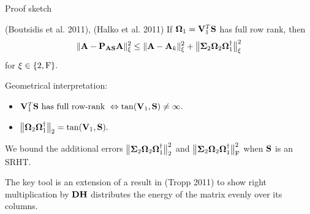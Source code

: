 \documentclass[xcolor=x11names,compress,ignorenonframetext]{beamer}
\renewcommand{\(}{\begin{columns}}
\renewcommand{\)}{\end{columns}}
\newcommand{\<}[1]{\begin{column}{#1}}
\renewcommand{\>}{\end{column}}
\def\refcolor{DodgerBlue4}
\newcommand{\refer}[1]{({\color{\refcolor}#1})}
\begin{document}
\begin{frame}{Proof sketch}

  \begin{block}{\refer{Boutsidis et al. 2011}, \refer{Halko et al. 2011} }
  If $\boldsymbol{\Omega}_1 = \mathbf{V}_1^T \mathbf{S}$ has full row rank, then
  \[
   \|\mathbf{A} - \mathbf{P}_{\mathbf{A}\mathbf{S}} \mathbf{A}\|_\xi^2 \leq \|\mathbf{A} - \mathbf{A}_k\|_\xi^2 + \big\| \boldsymbol{\Sigma}_2 \boldsymbol{\Omega}_2 \boldsymbol{\Omega}_1^\dagger\big\|_\xi^2
  \]
  for $\xi \in \{2, \mathrm{F}\}.$
 \end{block}

 Geometrical interpretation:
 \begin{itemize}
  \item $\mathbf{V}_1^T \mathbf{S} \text{ has full row-rank } \Leftrightarrow \tan(\mathbf{V}_1, \mathbf{S}) \neq \infty.$ 
  \item $\big\|\boldsymbol{\Omega}_2 \boldsymbol{\Omega}_1^\dagger\big\|_2 = \tan(\mathbf{V}_1, \mathbf{S}).$
 \end{itemize}

 We bound the additional errors $\big\| \boldsymbol{\Sigma}_2 \boldsymbol{\Omega}_2 \boldsymbol{\Omega}_1^\dagger\big\|_2^2$ and $\big\| \boldsymbol{\Sigma}_2 \boldsymbol{\Omega}_2 \boldsymbol{\Omega}_1^\dagger\big\|_{\mathrm{F}}^2$
 when $\mathbf{S}$ is an SRHT.
 \vspace{0.7em}
 
 The key tool is an extension of a result in \refer{Tropp 2011} to show right multiplication by $\mathbf{D}\mathbf{H}$ distributes the energy of the matrix
 evenly over its columns.

\end{frame}

% 
\end{document}
